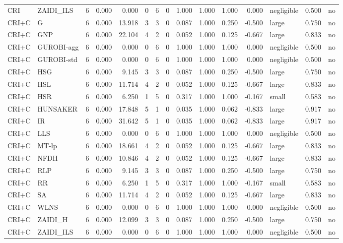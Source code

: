 \begin{table}[htbp]
\begin{tabular}{llrrrrrrrrrrlrr}
CRI & ZAIDI\_ILS & 6 & 0.000 & 0.000 & 0 & 6 & 0 & 1.000 & 1.000 & 1.000 & 0.000 & negligible & 0.500 & no \\
CRI+C & G & 6 & 0.000 & 13.918 & 3 & 3 & 0 & 0.087 & 1.000 & 0.250 & -0.500 & large & 0.750 & no \\
CRI+C & GNP & 6 & 0.000 & 22.104 & 4 & 2 & 0 & 0.052 & 1.000 & 0.125 & -0.667 & large & 0.833 & no \\
CRI+C & GUROBI-agg & 6 & 0.000 & 0.000 & 0 & 6 & 0 & 1.000 & 1.000 & 1.000 & 0.000 & negligible & 0.500 & no \\
CRI+C & GUROBI-std & 6 & 0.000 & 0.000 & 0 & 6 & 0 & 1.000 & 1.000 & 1.000 & 0.000 & negligible & 0.500 & no \\
CRI+C & HSG & 6 & 0.000 & 9.145 & 3 & 3 & 0 & 0.087 & 1.000 & 0.250 & -0.500 & large & 0.750 & no \\
CRI+C & HSL & 6 & 0.000 & 11.714 & 4 & 2 & 0 & 0.052 & 1.000 & 0.125 & -0.667 & large & 0.833 & no \\
CRI+C & HSR & 6 & 0.000 & 6.250 & 1 & 5 & 0 & 0.317 & 1.000 & 1.000 & -0.167 & small & 0.583 & no \\
CRI+C & HUNSAKER & 6 & 0.000 & 17.848 & 5 & 1 & 0 & 0.035 & 1.000 & 0.062 & -0.833 & large & 0.917 & no \\
CRI+C & IR & 6 & 0.000 & 31.642 & 5 & 1 & 0 & 0.035 & 1.000 & 0.062 & -0.833 & large & 0.917 & no \\
CRI+C & LLS & 6 & 0.000 & 0.000 & 0 & 6 & 0 & 1.000 & 1.000 & 1.000 & 0.000 & negligible & 0.500 & no \\
CRI+C & MT-lp & 6 & 0.000 & 18.661 & 4 & 2 & 0 & 0.052 & 1.000 & 0.125 & -0.667 & large & 0.833 & no \\
CRI+C & NFDH & 6 & 0.000 & 10.846 & 4 & 2 & 0 & 0.052 & 1.000 & 0.125 & -0.667 & large & 0.833 & no \\
CRI+C & RLP & 6 & 0.000 & 9.145 & 3 & 3 & 0 & 0.087 & 1.000 & 0.250 & -0.500 & large & 0.750 & no \\
CRI+C & RR & 6 & 0.000 & 6.250 & 1 & 5 & 0 & 0.317 & 1.000 & 1.000 & -0.167 & small & 0.583 & no \\
CRI+C & SA & 6 & 0.000 & 11.714 & 4 & 2 & 0 & 0.052 & 1.000 & 0.125 & -0.667 & large & 0.833 & no \\
CRI+C & WLNS & 6 & 0.000 & 0.000 & 0 & 6 & 0 & 1.000 & 1.000 & 1.000 & 0.000 & negligible & 0.500 & no \\
CRI+C & ZAIDI\_H & 6 & 0.000 & 12.099 & 3 & 3 & 0 & 0.087 & 1.000 & 0.250 & -0.500 & large & 0.750 & no \\
CRI+C & ZAIDI\_ILS & 6 & 0.000 & 0.000 & 0 & 6 & 0 & 1.000 & 1.000 & 1.000 & 0.000 & negligible & 0.500 & no \\

\end{tabular}
\end{table}
